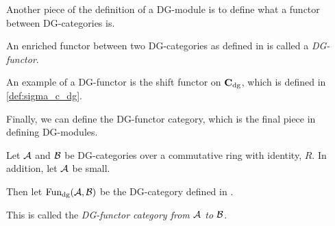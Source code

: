 Another piece of the definition of a DG-module is to define what a functor between DG-categories is.

\begin{definition}[DG-functor]
    An enriched functor between two DG-categories as defined in \cite[Definition 6.2.3]{Borceux_1994} is called a \emph{DG-functor}.
\end{definition}

An example of a DG-functor is the shift functor on \( \operatorname{\mathbf{C}}_{\operatorname{dg}} \), which is defined in \autoref{def:sigma_c_dg}.

Finally, we can define the DG-functor category, which is the final piece in defining DG-modules.

\begin{definition}
    \label{def:dg_functor_category}
    Let \( {\mathcal{A}} \) and \( {\mathcal{B}} \) be DG-categories over a commutative ring with identity, \( R \). In addition, let \( {\mathcal{A}} \) be small.

    Then let \( \operatorname{Fun}_{\operatorname{dg}}({\mathcal{A}}, {\mathcal{B}}) \) be the DG-category defined in \cite[Proposition 6.3.1]{Borceux_1994}.



    This is called the \emph{DG-functor category from \( {\mathcal{A}} \) to \( {\mathcal{B}} \)}.
\end{definition}

